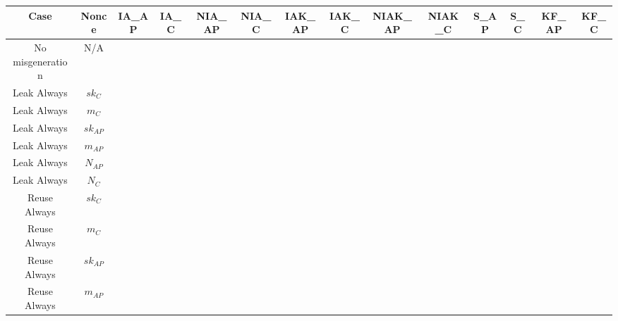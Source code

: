 \documentclass[crop]{standalone}
\newcommand{\noattack}{\color{ForestGreen}\usym{2713}\color{black}}
\newcommand{\attack}{\color{red}\usym{2717}\color{black}}
\begin{document}
\parbox{30cm}{
\begin{tabular}{|c|c|c|c|c|c|c|c|c|c|c|c|c|c|}
\hline
Case & Nonce & IA\_AP & IA\_C & NIA\_AP & NIA\_C & IAK\_AP & IAK\_C & NIAK\_AP & NIAK\_C & S\_AP & S\_C & KF\_AP & KF\_C \\ \hline
No misgeneration & N/A & \noattack & \noattack & \noattack & \noattack & \noattack & \noattack & \noattack & \noattack & \noattack & \noattack & \noattack & \noattack\\ \hline
Leak Always & $sk_C$ & \attack & \attack & \attack & \attack & \attack & \attack & \attack & \attack & \attack & \attack & \noattack & \noattack\\ \hline
Leak Always & $m_C$ & \attack & \attack & \attack & \attack & \attack & \attack & \attack & \attack & \attack & \attack & \noattack & \noattack\\ \hline
Leak Always & $sk_{AP}$ & \attack & \attack & \attack & \attack & \attack & \attack & \attack & \attack & \attack & \attack & \noattack & \noattack\\ \hline
Leak Always & $m_{AP}$ & \attack & \attack & \attack & \attack & \attack & \attack & \attack & \attack & \attack & \attack & \noattack & \noattack\\ \hline
Leak Always & $N_{AP}$ & \noattack & \noattack & \noattack & \noattack & \noattack & \noattack & \noattack & \noattack & \noattack & \noattack & \noattack & \noattack\\ \hline
Leak Always & $N_C$ & \noattack & \noattack & \noattack & \noattack & \noattack & \noattack & \noattack & \noattack & \noattack & \noattack & \noattack & \noattack\\ \hline
Reuse Always & $sk_C$ & \noattack & \noattack & \noattack & \noattack & \noattack & \noattack & \noattack & \noattack & \noattack & \noattack & \noattack & \noattack\\ \hline
Reuse Always & $m_C$ & \noattack & \noattack & \noattack & \noattack & \noattack & \noattack & \noattack & \noattack & \noattack & \noattack & \noattack & \noattack\\ \hline
Reuse Always & $sk_{AP}$ & \noattack & \noattack & \noattack & \noattack & \noattack & \noattack & \noattack & \noattack & \noattack & \noattack & \noattack & \noattack\\ \hline
Reuse Always & $m_{AP}$ & \noattack & \noattack & \noattack & \noattack & \noattack & \noattack & \noattack & \noattack & \noattack & \noattack & \noattack & \noattack\\ \hline

\end{tabular}}
\end{document}

